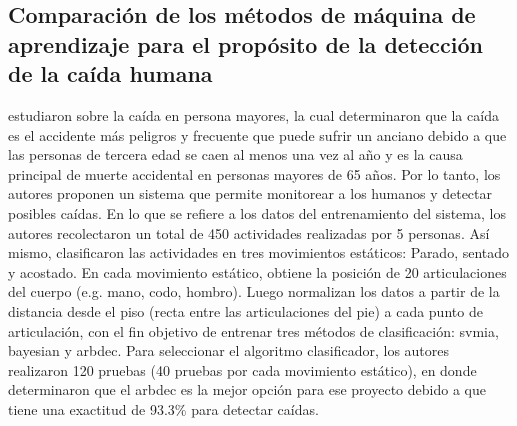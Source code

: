 \subsection{Comparaci\'on de los m\'etodos de m\'aquina de aprendizaje para el prop\'osito de la detecci\'on de la ca\'ida humana} \label{tr:4}
 estudiaron sobre la  ca\'ida en persona mayores, la cual determinaron que la ca\'ida  es el accidente m\'as peligros y frecuente que puede sufrir un anciano debido a que las personas de tercera edad se caen al menos una vez al a\~no y es la causa principal de muerte accidental en personas mayores de 65 a\~nos. Por lo tanto, los autores proponen un sistema que permite monitorear a los humanos y detectar posibles ca\'idas.
\medbreak
En lo que se refiere a los datos del entrenamiento del sistema, los autores recolectaron un total de 450 actividades realizadas por 5 personas. As\'i mismo, clasificaron las actividades en tres movimientos est\'aticos: Parado, sentado y acostado. En cada movimiento est\'atico, obtiene la posici\'on de 20 articulaciones del cuerpo (e.g. mano, codo, hombro). Luego normalizan los datos a partir de la distancia desde el piso (recta entre las articulaciones del pie) a cada punto de articulaci\'on, con el fin objetivo de entrenar tres m\'etodos de clasificaci\'on: \gls{svmia}, \gls{bayesian} y \gls{arbdec}.
\medbreak
Para seleccionar el algoritmo clasificador, los autores realizaron 120 pruebas (40 pruebas por cada movimiento est\'atico), en donde determinaron  que el \gls{arbdec} es la mejor opci\'on para ese proyecto debido a que tiene una exactitud de 93.3\% para detectar ca\'idas.
